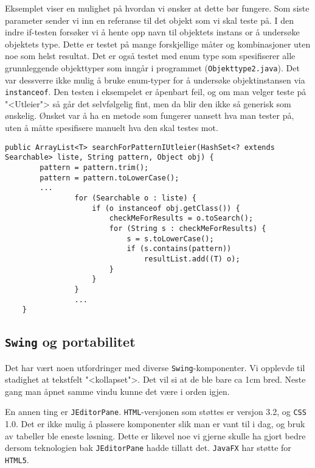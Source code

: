 Eksemplet viser en mulighet på hvordan vi ønsker at dette bør fungere. Som siste parameter sender vi inn en referanse til det objekt som vi skal teste på. I den indre if-testen forsøker vi å hente opp navn til objektets instans or å undersøke objektets type. Dette er testet på mange forskjellige måter og kombinasjoner uten noe som helst resultat. 
Det er også testet med enum type som spesifiserer alle grunnleggende objekttyper som inngår i programmet (\texttt{Objekttype2.java}). 
Det var dessverre ikke mulig å bruke enum-typer for å undersøke objektinstansen via \texttt{instanceof}. Den testen i eksempelet er åpenbart feil, og om man velger teste på "<Utleier"> så går det selvfølgelig fint, men da blir den ikke så generisk som ønskelig. Ønsket var å ha en metode som fungerer uansett hva man tester på, uten å måtte spesifisere manuelt hva den skal testes mot.


\begin{lstlisting}[caption={[Teste for objekttype]Problem med å teste for objekttype (rad 6).}, label=kode:objekttype]
    public ArrayList<T> searchForPatternIUtleier(HashSet<? extends Searchable> liste, String pattern, Object obj) {
        pattern = pattern.trim();
        pattern = pattern.toLowerCase();
        ...
                for (Searchable o : liste) {
                    if (o instanceof obj.getClass()) {
                        checkMeForResults = o.toSearch();
                        for (String s : checkMeForResults) {
                            s = s.toLowerCase();
                            if (s.contains(pattern))
                                resultList.add((T) o);
                        }
                    }
                }     
                ...
    }
\end{lstlisting}




\subsection{\texttt{Swing} og portabilitet} \label{subsec:portabilitet}
Det har vært noen utfordringer med diverse \texttt{Swing}-komponenter. Vi opplevde til stadighet at tekstfelt "<kollapset">. Det vil si at de ble bare ca 1cm bred. Neste gang man åpnet samme vindu kunne det være i orden igjen. 

En annen ting er \texttt{JEditorPane}. \texttt{HTML}-versjonen som støttes er versjon 3.2, og \texttt{CSS} 1.0. 
Det er ikke mulig å plassere komponenter slik man er vant til i dag, og bruk av tabeller ble eneste løsning. Dette er likevel noe vi gjerne skulle ha gjort bedre dersom teknologien bak \texttt{JEditorPane} hadde tillatt det. \texttt{JavaFX} har støtte for \texttt{HTML5}.

